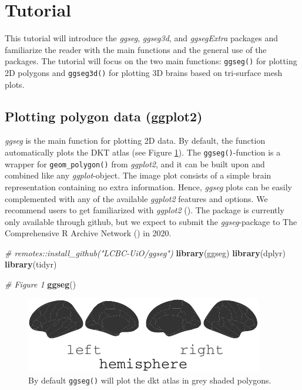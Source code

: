 \documentclass[fleqn,10pt]{wlpeerj} %
\newenvironment{Shaded}{\begin{snugshade}}{\end{snugshade}}
\newcommand{\CommentTok}[1]{\textcolor[rgb]{0.56,0.35,0.01}{\textit{#1}}}
\newcommand{\KeywordTok}[1]{\textcolor[rgb]{0.13,0.29,0.53}{\textbf{#1}}}
\newcommand{\NormalTok}[1]{#1}
\begin{document}
\hypertarget{tutorial}{%
\section{Tutorial}\label{tutorial}}

This tutorial will introduce the \emph{ggseg}, \emph{ggseg3d}, and \emph{ggsegExtra} packages and familiarize the reader with the main functions and the general use of the packages.
The tutorial will focus on the two main functions: \texttt{ggseg()} for plotting 2D polygons and \texttt{ggseg3d()} for plotting 3D brains based on tri-surface mesh plots.

\hypertarget{plotting-polygon-data-ggplot2}{%
\subsection{Plotting polygon data (ggplot2)}\label{plotting-polygon-data-ggplot2}}

\emph{ggseg} is the main function for plotting 2D data.
By default, the function automatically plots the DKT atlas (see Figure \ref{fig:init}).
The \texttt{ggseg()}-function is a wrapper for \texttt{geom\_polygon()} from \emph{ggplot2}, and it can be built upon and combined like any \emph{ggplot}-object.
The image plot consists of a simple brain representation containing no extra information.
Hence, \emph{ggseg} plots can be easily complemented with any of the available \emph{ggplot2} features and options.
We recommend users to get familiarized with \emph{ggplot2} (\citet{ggplot}).
The package is currently only available through github, but we expect to submit the \emph{ggseg}-package to The Comprehensive R Archive Network (\citet{cran}) in 2020.

\begin{Shaded}
\begin{Highlighting}[]
\CommentTok{\# remotes::install\_github("LCBC{-}UiO/ggseg")}
\KeywordTok{library}\NormalTok{(ggseg)}
\KeywordTok{library}\NormalTok{(dplyr)}
\KeywordTok{library}\NormalTok{(tidyr)}

\CommentTok{\# Figure 1}
\KeywordTok{ggseg}\NormalTok{()}
\end{Highlighting}
\end{Shaded}

\begin{figure}
\centering
\includegraphics{msc_ggseg_files/figure-latex/init-1.pdf}
\caption{\label{fig:init}By default \texttt{ggseg()} will plot the dkt atlas in grey shaded polygons.}
\end{figure}
\end{document}
